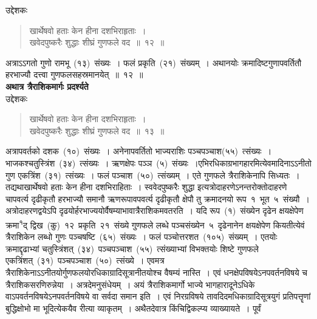 \documentclass[11pt, openany]{book}
\begin{document}
\newpage
\thispagestyle{fancy}
\fancyhf{}
उद्देशकः\textendash
\begin{quote}
{\ku खार्थेषवो हताः केन हीना दशभिराहृताः~।\\
खवेदपुष्करैः शुद्धाः शीघ्रं गुणफले वद~॥~१२~॥}
\end{quote}

\indent
अत्राऽऽगतो गुणो रामभू~(१३)~संख्यः~। फलं प्रकृति~(२१)~संख्यम्~। अथानयोः क्रमादिष्टगुणापवर्तितौ हरभाज्यौ दत्त्वा गुणफलसहस्रमानयेत्~॥~१२~॥\\
\indent
\textbf{अथात्र त्रैराशिकमार्गः प्रदर्श्यते\textendash}\\
उद्देशकः\textendash
\begin{quote}
{\ku खार्थेषवो हताः केन हीना दशभिराहृताः~।\\
खवेदपुष्करैः शुद्धाः शीघ्रं गुणफले वद~॥~१३~॥}
\end{quote}
\indent
अत्रापवर्तको दशक~(१०)~संख्यः~। अनेनापवर्तितो भाज्यराशिः पञ्चपञ्चाश(५५)~त्संख्यः~।भाजकश्चतुस्त्रिंश~(३४)~त्संख्यः~। ऋणक्षेपः पञ्ञ~(५)~संख्यः~।एभिरधिकाग्रभागहारमित्येवमादिनाऽऽनीतो गुण एकत्रिंश~(३१)~त्संख्यः~। फलं पञ्चाश~(५०)~त्संख्यम्~। एते गुणफले त्रैराशिकेनापि सिध्यतः~। तद्यथा\textendash खार्थेषवो हताः केन हीना दशभिराहिताः~। स्ववेदपुष्करैः शुद्धा इत्यत्रोदाहरणेऽनन्तरोक्तोदाहरणे चापवर्त्य दृढीकृतौ हरभाज्यौ समानौ ऋणरूपावपवर्त्य दृढीकृतौ क्षेपौ तु क्रमादनयो रूप~१~भूत~५~संख्यौ~। अत्रोदाहरणद्वयेऽपि दृढयोर्हरभाज्ययोर्वैषम्याभावात्रैराशिकमवतरति~। यदि रूप~(१)~संख्येन दृढेन क्षयक्षेपेण क्रमा\textsuperscript{१}द् द्विख~(कु)~१२~प्रकृति~२१~संख्ये गुणफले लब्धे पञ्चसंख्येन~५~दृढेनानेन क्षयक्षेपेण कियतीत्येवं त्रैराशिकेन लब्धो गुणः पञ्चषष्टि~(६५)~संख्यः~। फलं पञ्चोत्तरशत~(१०५)~संख्यम्~। एतयोः क्रमाद्दृढाभ्यां चतुस्त्रिंशत्~(३४)~पञ्चपञ्चाश~(५५)~त्संख्याभ्यां विभक्तयोः शिष्टे गुणफले एकत्रिंशत्~(३१)~पञ्चपञ्चाश~(५०)~त्संख्ये~। एवमत्र त्रैराशिकेनाऽऽनीतयोर्गुणफलयोरधिकाग्रादिसूत्रानीतयोश्च वैषम्यं नास्ति~। एवं धनक्षेपविषयेऽनपवर्तनविषये च त्रैराशिकसरणिरुन्नेया~। अत्रदेमनुसंधेयम्~। अयं त्रैराशिकमार्गो भाज्ये भागहारादूनेऽधिके वाऽपवर्तनविषयेऽनपवर्तनविषये वा सर्वदा समान इति~। एवं निरग्रविषये तावदिदमधिकाग्रादिसूत्रयुगं प्रतिपत्तॄणां बुद्धिक्षोभो मा भूदित्येकयैव रीत्या व्याकृतम्~। अथैतदेवात्र किंचिद्विकल्प्य व्याख्यायते~। पूर्वं

\end{document}
